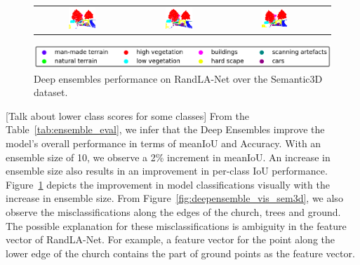 \begin{figure}[h!]
\begin{tabular}{cccc}
            \includegraphics[width=0.30\textwidth, height=0.15\textheight]{images/seg_output/deep_ensembles/2_1.pdf} &
            \includegraphics[width=0.30\textwidth, height=0.15\textheight]{images/seg_output/deep_ensembles/2_5.pdf}& 
            \includegraphics[width=0.30\textwidth, height=0.15\textheight]{images/seg_output/deep_ensembles/2_10.pdf}\\
        \end{tabular}
        \includegraphics[scale=0.45]{images/legend.png}
        \caption{Deep ensembles performance on RandLA-Net over the Semantic3D dataset.}
        \label{fig:deepensemble_improv}
    \end{figure}

    [Talk about lower class scores for some classes]
    From the Table~\ref{tab:ensemble_eval}, we infer that the Deep Ensembles improve the model's overall performance in terms of meanIoU and Accuracy.
    With an ensemble size of 10, we observe a 2\% increment in meanIoU.
    An increase in ensemble size also results in an improvement in per-class IoU performance.
    Figure~\ref{fig:deepensemble_improv} depicts the improvement in model classifications visually with the increase in ensemble size.
    From Figure~\ref{fig:deepensemble_vis_sem3d}, we also observe the misclassifications along the edges of the church, trees and ground.
    The possible explanation for these misclassifications is ambiguity in the feature vector of RandLA-Net. For example, a feature vector for the point along the lower edge of the church contains the part of ground points as the feature vector.
